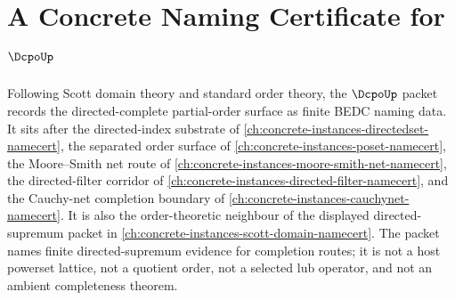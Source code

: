 \chapter{A Concrete Naming Certificate for $\DcpoUp$}
\label{ch:concrete-instances-dcpo-namecert}

Following Scott domain theory and standard order theory, the $\DcpoUp$ packet records the directed-complete partial-order surface as finite BEDC naming data. It sits after the directed-index substrate of \autoref{ch:concrete-instances-directedset-namecert}, the separated order surface of \autoref{ch:concrete-instances-poset-namecert}, the Moore--Smith net route of \autoref{ch:concrete-instances-moore-smith-net-namecert}, the directed-filter corridor of \autoref{ch:concrete-instances-directed-filter-namecert}, and the Cauchy-net completion boundary of \autoref{ch:concrete-instances-cauchynet-namecert}. It is also the order-theoretic neighbour of the displayed directed-supremum packet in \autoref{ch:concrete-instances-scott-domain-namecert}. The packet names finite directed-supremum evidence for completion routes; it is not a host powerset lattice, not a quotient order, not a selected lub operator, and not an ambient completeness theorem.

